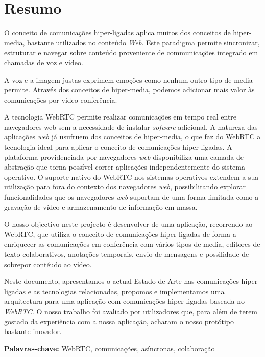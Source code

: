 \chapter*{Resumo}


O conceito de comunicações hiper-ligadas aplica muitos dos conceitos de hiper-media, bastante utilizados no conteúdo \emph{Web}. Este paradigma permite sincronizar, estruturar e navegar sobre conteúdo proveniente de communicações integrado em chamadas de voz e vídeo.


A voz e a imagem justas exprimem emoções como nenhum outro tipo de media permite. Através dos conceitos de hiper-media, podemos adicionar mais valor às comunicações por video-conferência.

A tecnologia \ac{WebRTC} permite realizar comunicações em tempo real entre navegadores web sem a necessidade de instalar \emph{sofware} adicional. A natureza das aplicações \emph{web} já usufruem dos conceitos de hiper-media, o que faz do \ac{WebRTC} a tecnologia ideal para aplicar o conceito de comunicações hiper-ligadas.
A plataforma providenciada por navegadores \emph{web} disponibiliza uma camada de abstração que torna possível correr aplicações independentemente do sistema operativo.
O suporte nativo do \ac{WebRTC} nos sistemas operativos extendem a sua utilização para fora do contexto dos navegadores \emph{web}, possibilitando explorar funcionalidades que os navegadores \emph{web} suportam de uma forma limitada como a gravação de vídeo e armazenamento de informação em massa.

O nosso objectivo neste projecto é desenvolver de uma aplicação, recorrendo ao \ac{WebRTC}, que utiliza o conceito de comunicações hiper-ligadas de forma a enriquecer as comunicações em conferência com vários tipos de media, editores de texto colaborativos, anotações temporais, envio de mensagens e possilidade de sobrepor contéudo ao vídeo.


Neste documento, apresentamos o actual Estado de Arte nas comunicações hiper-ligadas e as tecnologias relacionadas, propomos e implementamos uma arquitectura para uma aplicação com comunicações hiper-ligadas baseada no \emph{WebRTC}. O nosso trabalho foi avaliado por utilizadores que, para além de terem gostado da experiência com a nossa aplicação, acharam o nosso protótipo bastante inovador.

\vspace{1cm}

\textbf{\Large Palavras-chave:} WebRTC, comunicações, asíncronas, colaboração


\cleardoublepage
